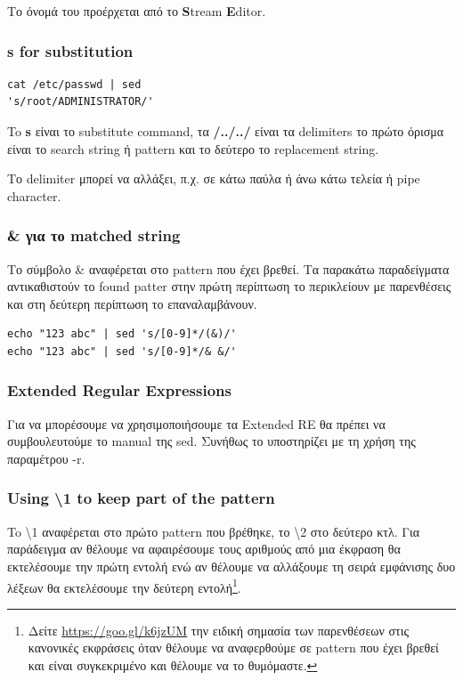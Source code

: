 Το όνομά του προέρχεται από το \textbf{S}tream \textbf{E}ditor.

\subsubsection{s for substitution}

\begin{lstlisting}
cat /etc/passwd | sed 
's/root/ADMINISTRATOR/'
\end{lstlisting}

To \textbf{s} είναι το substitute command, τα \textbf{/../../} είναι τα delimiters το πρώτο όρισμα είναι το search string ή pattern και το δεύτερο το replacement string.

Το delimiter μπορεί να αλλάξει, π.χ. σε κάτω παύλα ή άνω κάτω τελεία ή pipe character.

\subsubsection{\& για το matched string}

Το σύμβολο \& αναφέρεται στο pattern που έχει βρεθεί. Τα παρακάτω παραδείγματα αντικαθιστούν το found patter στην πρώτη περίπτωση το περικλείουν με παρενθέσεις και στη δεύτερη περίπτωση το επαναλαμβάνουν.
 
\begin{lstlisting}
echo "123 abc" | sed 's/[0-9]*/(&)/'
echo "123 abc" | sed 's/[0-9]*/& &/'
\end{lstlisting}


\subsubsection{Extended Regular Expressions}

Για να μπορέσουμε να χρησιμοποιήσουμε τα Extended RE θα πρέπει να συμβουλευτούμε το manual της sed. Συνήθως το υποστηρίζει με τη χρήση της παραμέτρου -r.

\subsubsection{Using \textbackslash 1 to keep part of the pattern}
To \textbackslash 1 αναφέρεται στο πρώτο pattern που βρέθηκε, το \textbackslash 2 στο δεύτερο κτλ. 
Για παράδειγμα αν θέλουμε να αφαιρέσουμε τους αριθμούς από μια έκφραση θα εκτελέσουμε την πρώτη εντολή ενώ αν θέλουμε να αλλάξουμε τη σειρά εμφάνισης δυο λέξεων θα εκτελέσουμε την δεύτερη εντολή\footnote{Δείτε \href{https://goo.gl/k6jzUM}{https://goo.gl/k6jzUM} την ειδική σημασία των παρενθέσεων στις κανονικές εκφράσεις όταν θέλουμε να αναφερθούμε σε pattern που έχει βρεθεί και είναι συγκεκριμένο και θέλουμε να το θυμόμαστε.}.



